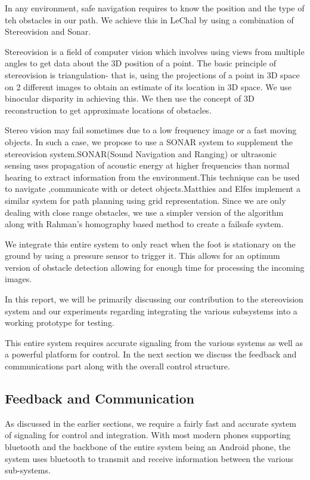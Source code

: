 \documentclass[11pt]{report}
\begin{document}
In any environment, safe navigation requires to know the position and the type of teh obstacles in our path. We achieve this in LeChal by using a combination of Stereovision and Sonar. 

Stereovision is a field of computer vision which involves using views from multiple angles to get data about the 3D position of a point. The basic principle of stereovision is triangulation- that is, using the projections of a point in 3D space on 2 different images to obtain an estimate of its location in 3D space. We use binocular disparity in achieving this. We then use the concept of 3D reconstruction\cite{hartley2000multiple} to get approximate locations of obstacles.

Stereo vision may fail sometimes due to a low frequency image or a fast moving objects. In such a case, we propose to use a SONAR system to supplement the stereovision system.SONAR(Sound Navigation and Ranging) or ultrasonic sensing uses propagation of acoustic energy at higher frequencies than normal hearing to extract information from the environment.This technique can be used to navigate ,communicate with or detect objects.Matthies and Elfes\cite{sonarstereo} implement a similar system for path planning using grid representation. Since we are only dealing with close range obstacles, we use a simpler version of the algorithm along with Rahman's homography based method\cite{obstacleavoidance} to create a failsafe system. 

We integrate this entire system to only react when the foot is stationary on the ground by using a pressure sensor to trigger it. This allows for an optimum version of obstacle detection allowing for enough time for processing the incoming images.

In this report, we will be primarily discussing our contribution to the stereovision system and our experiments regarding integrating the various subsystems into a working prototype for testing.

This entire system requires accurate signaling from the various systems as well as a powerful platform for control. In the next section we discuss the feedback and communications part along with the overall control structure.

\subsection{Feedback and Communication}

As discussed in the earlier sections, we require a fairly fast and accurate system of signaling for control and integration. With most modern phones supporting bluetooth and the backbone of the entire system being an Android phone, the system uses bluetooth to transmit and receive information between the various sub-systems. 
\end{document}
